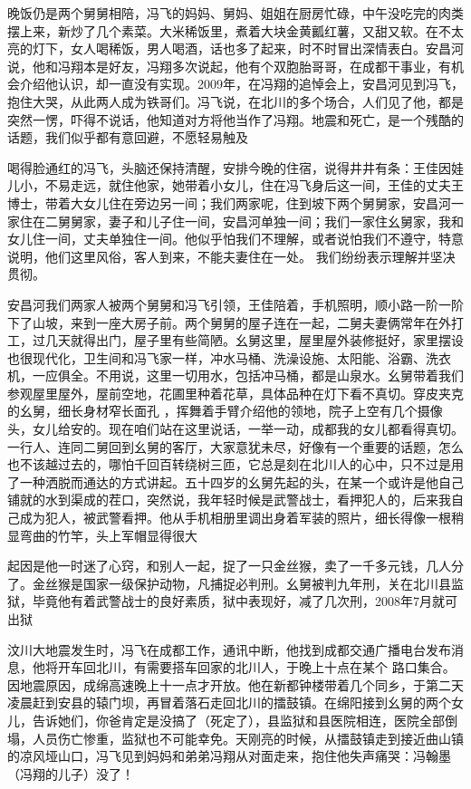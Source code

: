 \documentclass{article}
\begin{document}
晚饭仍是两个舅舅相陪，冯飞的妈妈、舅妈、姐姐在厨房忙碌，中午没吃完的肉类摆上来，新炒了几个素菜。大米稀饭里，煮着大块金黄瓤红薯，又甜又软。在不太亮的灯下，女人喝稀饭，男人喝酒，话也多了起来，时不时冒出深情表白。安昌河说，他和冯翔本是好友，冯翔多次说起，他有个双胞胎哥哥，在成都干事业，有机会介绍他认识，却一直没有实现。2009年，在冯翔的追悼会上，安昌河见到冯飞，抱住大哭，从此两人成为铁哥们。冯飞说，在北川的多个场合，人们见了他，都是突然一愣，吓得不说话，他知道对方将他当作了冯翔。地震和死亡，是一个残酷的话题，我们似乎都有意回避，不愿轻易触及

\newpage

喝得脸通红的冯飞，头脑还保持清醒，安排今晚的住宿，说得井井有条：王佳因娃儿小，不易走远，就住他家，她带着小女儿，住在冯飞身后这一间，王佳的丈夫王博士，带着大女儿住在旁边另一间；我们两家呢，住到坡下两个舅舅家，安昌河一家住在二舅舅家，妻子和儿子住一间，安昌河单独一间；我们一家住幺舅家，我和女儿住一间，丈夫单独住一间。他似乎怕我们不理解，或者说怕我们不遵守，特意说明，他们这里风俗，客人到来，不能夫妻住在一处。
我们纷纷表示理解并坚决贯彻。 

安昌河我们两家人被两个舅舅和冯飞引领，王佳陪着，手机照明，顺小路一阶一阶下了山坡，来到一座大房子前。两个舅舅的屋子连在一起，二舅夫妻俩常年在外打工，过几天就得出门，屋子里有些简陋。幺舅这里，屋里屋外装修挺好，家里摆设也很现代化，卫生间和冯飞家一样，冲水马桶、洗澡设施、太阳能、浴霸、洗衣机，一应俱全。不用说，这里一切用水，包括冲马桶，都是山泉水。幺舅带着我们参观屋里屋外，屋前空地，花圃里种着花草，具体品种在灯下看不真切。穿皮夹克的幺舅，细长身材窄长面孔
\newpage
，挥舞着手臂介绍他的领地，院子上空有几个摄像头，女儿给安的。现在咱们站在这里说话，一举一动，成都我的女儿都看得真切。一行人、连同二舅回到幺舅的客厅，大家意犹未尽，好像有一个重要的话题，怎么也不该越过去的，哪怕千回百转绕树三匝，它总是刻在北川人的心中，只不过是用了一种洒脱而通达的方式讲起。五十四岁的幺舅先起的头，在某一个或许是他自己铺就的水到渠成的茬口，突然说，我年轻时候是武警战士，看押犯人的，后来我自己成为犯人，被武警看押。他从手机相册里调出身着军装的照片，细长得像一根稍显弯曲的竹竿，头上军帽显得很大

起因是他一时迷了心窍，和别人一起，捉了一只金丝猴，卖了一千多元钱，几人分了。金丝猴是国家一级保护动物，凡捕捉必判刑。幺舅被判九年刑，关在北川县监狱，毕竟他有着武警战士的良好素质，狱中表现好，减了几次刑，2008年7月就可出狱

汶川大地震发生时，冯飞在成都工作，通讯中断，他找到成都交通广播电台发布消息，他将开车回北川，有需要搭车回家的北川人，于晚上十点在某个
\newpage
路口集合。因地震原因，成绵高速晚上十一点才开放。他在新都钟楼带着几个同乡，于第二天凌晨赶到安县的辕门坝，再冒着落石走回北川的擂鼓镇。在绵阳接到幺舅的两个女儿，告诉她们，你爸肯定是没搞了（死定了），县监狱和县医院相连，医院全部倒塌，人员伤亡惨重，监狱也不可能幸免。天刚亮的时候，从擂鼓镇走到接近曲山镇的凉风垭山口，冯飞见到妈妈和弟弟冯翔从对面走来，抱住他失声痛哭：冯翰墨
（冯翔的儿子）没了！ 
\end{document}
